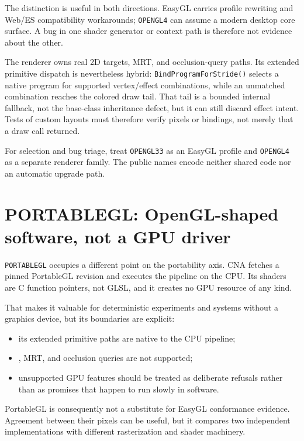 The distinction is useful in both directions.  EasyGL carries profile rewriting and Web/ES
compatibility workarounds; \texttt{OPENGL4} can assume a modern desktop core surface.  A bug
in one shader generator or context path is therefore not evidence about the other.

The renderer owns real 2D targets, MRT, and occlusion-query paths.  Its extended primitive
dispatch is nevertheless hybrid: \texttt{BindProgramForStride()} selects a native program
for supported vertex/effect combinations, while an unmatched combination reaches the colored
draw tail.  That tail is a bounded internal fallback, not the base-class inheritance defect,
but it can still discard effect intent.  Tests of custom layouts must therefore verify pixels
or bindings, not merely that a draw call returned.

\begin{sourcenote}
For selection and bug triage, treat \texttt{OPENGL33} as an EasyGL profile and
\texttt{OPENGL4} as a separate renderer family.  The public names encode neither shared code
nor an automatic upgrade path.
\end{sourcenote}

\section{PORTABLEGL: OpenGL-shaped software, not a GPU driver}

\texttt{PORTABLEGL} occupies a different point on the portability axis.  CNA fetches a pinned
PortableGL revision and executes the pipeline on the CPU.  Its shaders are C function
pointers, not GLSL, and it creates no GPU resource of any kind.

That makes it valuable for deterministic experiments and systems without a graphics device,
but its boundaries are explicit:

\begin{itemize}
  \item its extended primitive paths are native to the CPU pipeline;
  \item {}, MRT, and occlusion queries are not supported;
  \item unsupported GPU features should be treated as deliberate refusals rather than as
        promises that happen to run slowly in software.
\end{itemize}

PortableGL is consequently not a substitute for EasyGL conformance evidence.  Agreement
between their pixels can be useful, but it compares two independent implementations with
different rasterization and shader machinery.

